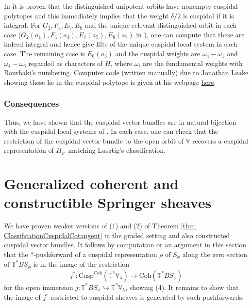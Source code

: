 \documentclass{amsart}
\theoremstyle{definition}
\theoremstyle{remark}
\numberwithin{equation}{section}
\newcommand{\Coh}{\mathrm{Coh}}
\newcommand{\Cusp}{\mathrm{Cusp}}
\newcommand{\V}{\mathbb{V}}
\newcommand{\T}{\mathbb{T}}
\begin{document}
In \cite{BMKL} it is proven that the distinguished unipotent orbits have nonempty cuspidal polytopes and this immediately implies that the weight $\delta/2$ is cuspidal if it is integral. For $G_2, F_4, E_7, E_8$ and the unique relevant distinguished orbit in each case ($G_2(a_1), F_4(a_3), E_7(a_5), E_8(a_7)$ in \cite{BalaCarterII}), one can compute that these are indeed integral and hence give lifts of the unique cuspidal local system in each case. The remaining case is $E_6(a_3)$ and the cuspidal weights are $\omega_4 - \omega_1$ and $\omega_4 - \omega_6$ regarded as characters of $H$, where $\omega_i$ are the fundamental weights with Bourbaki's numbering. Computer code (written manually) due to Jonathan Leake showing these lie in the cuspidal polytope is given at his webpage \href{https://www.jleake.com/res/distinguished-rho-positivity/#cuspidal-weights}{here}.

\subsubsection{Consequences}

Thus, we have shown that the cuspidal vector bundles are in natural bijection with the cuspidal local systems of \cite{LusztigIntersection}. In each case, one can check that the restriction of the cuspidal vector bundle to the open orbit of $\V$ recovers a cuspidal representation of $H_{c^{\circ}}$ matching Lusztig's classification. 

\section{Generalized coherent and constructible Springer sheaves}{\label{s: Springer}}

We have proven weaker versions of (1) and (2) of Theorem \ref{thm: ClassificationCuspidalCotangent} in the graded setting and also constructed cuspidal vector bundles. It follows by computation or an argument in this section that the $\ast$-pushforward of a cuspidal representation $\rho$ of $S_{\phi}$ along the zero section of $\T^{\ast} BS_{\phi}$ is in the image of the restriction
\begin{equation*}
    j^*\colon \Cusp^\Coh(\T^{\ast} \V_{\lambda}) \rightarrow \Coh(\T^{\ast} BS_{\phi})
\end{equation*}
for the open immersion $j\colon \T^* BS_\phi\hookrightarrow \T^*\V_\lambda$, showing (4). It remains to show that the image of $j^*$ restricted to cuspidal sheaves is generated by such pushforwards. 
\end{document}
